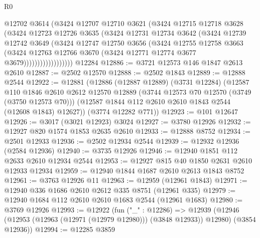 \begin{lexlean}{R0}
\begin{coremodule}
                      @12702
                      @3614
                      (@3424
                        @12707
                        @12710
                        @3621
                        (@3424
                          @12715
                          @12718
                          @3628
                          (@3424
                            @12723
                            @12726
                            @3635
                            (@3424
                              @12731
                              @12734
                              @3642
                              (@3424
                                @12739
                                @12742
                                @3649
                                (@3424
                                  @12747
                                  @12750
                                  @3656
                                  (@3424
                                    @12755
                                    @12758
                                    @3663
                                    (@3424
                                      @12763
                                      @12766
                                      @3670
                                      (@3424 @12771 @12774 @3677 @3679))))))))))))))))))
    @12284
@12886 := @3721 @12573 @146 @1847 @2613 @2610
@12887 := @2502 @12570
@12888 := @2502 @1843
@12889 := @12888 @2544
@12922 := @12881
    (@12886
      (@12887 @12889)
      (@3731 @12284)
      (@12587
        @110
        @1846
        @2610
        @2612
        @12570
        @12889
        (@3744 @12573 @70 @12570 (@3749 (@3750 @12573 @70)))
        (@12587 @1844 @112 @2610 @2610 @1843 @2544 (@12608 @1843) @12627))
      (@3774 @12282 @771))
@12923 := @101 @12647
@12926 := @3017 (@3021 @12923) @3024
@12927 := @3780 @12926
@12932 := @12927 @820 @1574 @1853 @2635 @2610
@12933 := @12888 @8752
@12934 := @2501 @12933
@12936 := @2502 @12934 @2544
@12939 := @12932 @12936 (@2584 @12936)
@12940 := @3735 @12926
@12946 := @12940 @1851 @112 @2633 @2610 @12934 @2544
@12953 := @12927 @815 @40 @1850 @2631 @2610 @12933 @12934
@12959 := @12940 @1844 @1687 @2610 @2613 @1843 @8752
@12961 := @3763 @12926 @11
@12963 := @12959 (@12961 @1843)
@12971 := @12940 @336 @1686 @2610 @2612 @335 @8751 (@12961 @335)
@12979 := @12940 @1684 @112 @2610 @2610 @1683 @2544 (@12961 @1683)
@12980 := @3769 @12926
@12993 := @12922
    (fun ("_" : @12286) =>
    @12939 (@12946 (@12953 (@12963 (@12971 (@12979 @12980))) (@3848 @12933)) @12980) (@3854 @12936))
@12994 := @12285 @3859

\end{coremodule}
\end{lexlean}
